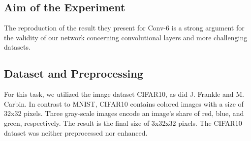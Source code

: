 \subsection*{Aim of the Experiment}
The reproduction of the result they present for Conv-6 is a strong argument for the validity of our network concerning convolutional layers and more challenging datasets. 

\subsection*{Dataset and Preprocessing}
For this task, we utilized the image dataset CIFAR10, as did J. Frankle and M. Carbin. In contrast to MNIST, CIFAR10 contains colored images with a size of 32x32 pixels. Three gray-scale images encode an image's share of red, blue, and green, respectively. The result is the final size of 3x32x32 pixels.
The CIFAR10 dataset was neither preprocessed nor enhanced.

